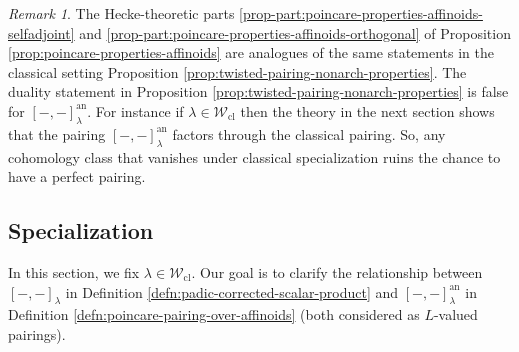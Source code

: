 \documentclass[10pt, twoside]{amsart}
\theoremstyle{plain}
\theoremstyle{definition}
\theoremstyle{remark}
\newtheorem{remark}[theorem]{Remark}
\numberwithin{equation}{subsection}
\def\an{\mathrm{an}}
\def\scrw{\mathscr W}
\def\cl{\mathrm{cl}}
\begin{document}
\begin{remark}
The Hecke-theoretic parts \ref{prop-part:poincare-properties-affinoids-selfadjoint} and \ref{prop-part:poincare-properties-affinoids-orthogonal} of Proposition \ref{prop:poincare-properties-affinoids} are analogues of the same statements in the classical setting Proposition \ref{prop:twisted-pairing-nonarch-properties}. The duality statement in Proposition \ref{prop:twisted-pairing-nonarch-properties} is false for $[-,-]_{\lambda}^{\an}$. For instance if $\lambda \in \scrw_{\cl}$ then the theory in the next section shows that the pairing $[-,-]_\lambda^{\an}$ factors through the classical pairing. So, any cohomology class that vanishes under classical specialization ruins the chance to have a perfect pairing.
\end{remark}

\subsection{Specialization}\label{subsec:classical-p-adic-weights}

In this section, we fix $\lambda \in \scrw_{\cl}$. Our  goal is to clarify the relationship between $[-,-]_\lambda$ in Definition \ref{defn:padic-corrected-scalar-product} and $[-,-]_{\lambda}^{\an}$ in Definition \ref{defn:poincare-pairing-over-affinoids} (both considered as $L$-valued pairings). 
\end{document}
